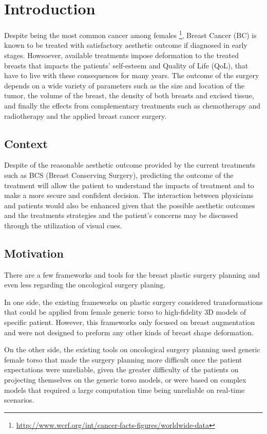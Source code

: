 \chapter{Introduction} \label{chap:intro}
Despite being the most common cancer among females \footnote{\url{http://www.wcrf.org/int/cancer-facts-figures/worldwide-data}}, Breast Cancer (BC) is known to be treated with satisfactory aesthetic outcome if diagnosed in early stages. Howsoever, available treatments impose deformation to the treated breasts that  impacts the patients' self-esteem and Quality of Life (QoL), that have to live with these consequences for many years. The outcome of the surgery depends on a wide variety of parameters such as the size and location of the tumor, the volume of the breast, the density of both breasts and excised tissue, and finally the effects from complementary treatments such as chemotherapy and radiotherapy and the applied breast cancer surgery.

\section{Context} \label{sec:context}
Despite of the reasonable aesthetic outcome provided by the current treatments such as BCS (Breast Conserving Surgery), predicting the outcome of the treatment will allow the patient to understand the impacts of treatment and to make a more secure and confident decision. The interaction between physicians and patients would also be enhanced given that the possible aesthetic outcomes and the treatments strategies and the patient's concerns may be discussed through the utilization of visual cues.

\section{Motivation} \label{sec:motiv}
There are a few frameworks and tools for the breast plastic surgery planning and even less regarding the oncological surgery planing. 

In one side, the existing frameworks on plastic surgery considered transformations that could be applied from female generic torso to high-fidelity 3D models of specific patient. However, this frameworks only focused on breast augmentation and were not designed to preform any other kinds of breast shape deformation.

On the other side, the existing tools on oncological surgery planning used generic female torso that made the surgery planning more difficult once the patient expectations were unreliable, given the greater difficulty of the patients on projecting themselves on the generic torso models, or were based on complex models that required a large computation time being unreliable on real-time scenarios.


